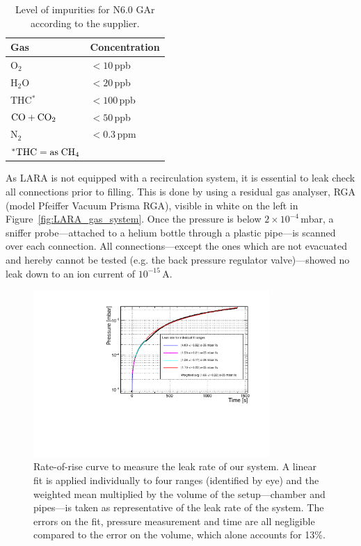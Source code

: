 \documentclass[a4paper,11pt]{article}
\begin{document}
 \begin{table}[tb]
\centering
\caption[]{Level of impurities for N6.0 GAr according to the supplier.}
    
    \smallskip
    \begin{tabular} { ll@{}}
    \toprule
    \multicolumn{1}{l}{Gas} &\multicolumn{1}{l}{Concentration} \\
    \midrule
    O$_2$             & $<10$\,ppb    \\
    H$_2$O            & $<20$\,ppb    \\
    THC$^*$           & $<100$\,ppb   \\
    $\rm CO+CO_2$     & $<50$\,ppb    \\
    N$_2$             & $<0.3$\,ppm   \\
    \multicolumn{1}{l}{\tiny $^*\rm THC = as\; CH_4$} 
    \end{tabular}
    \label{tab:airproducts}
\end{table}
As LARA is not equipped with a recirculation system, it is essential to leak check all connections prior to filling. This is done by using a residual gas analyser, RGA (model Pfeiffer Vacuum Prisma RGA), visible in white on the left in Figure~\ref{fig:LARA_gas_system}. Once the pressure is below $2\times10^{-4}$\,mbar, a sniffer probe---attached to a helium bottle through a plastic pipe---is scanned over each connection. All connections---except the ones which are not evacuated and hereby cannot be tested (e.g. the back pressure regulator valve)---showed no leak down to an ion current of $10^{-15}$\,A.  

\begin{figure}[tb]
	\begin{center}
	\includegraphics[width=0.8\textwidth]{figures/leak_rate.pdf}
	\caption{Rate-of-rise curve to measure the leak rate of our system. A linear fit is applied individually to four ranges (identified by eye) and the weighted mean multiplied by the volume of the setup---chamber and pipes---is taken as representative of the leak rate of the system. The errors on the fit, pressure measurement and time are all negligible compared to the error on the volume, which alone accounts for 13\%.}
	\label{fig:leak_rate}
	\end{center}
\end{figure}
\end{document}
